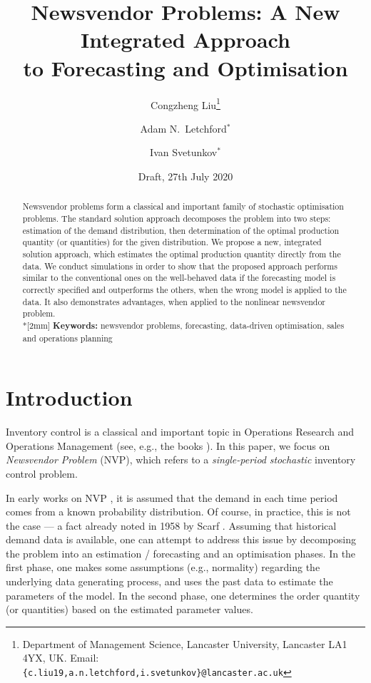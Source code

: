 \documentclass{article}
\title{Newsvendor Problems: A New Integrated Approach\\ to Forecasting and Optimisation}
\author{Congzheng Liu\thanks{Department of Management Science,
Lancaster University, Lancaster LA1 4YX, UK.
Email: {\tt \{c.liu19,a.n.letchford,i.svetunkov\}@lancaster.ac.uk}}
\and Adam N.\ Letchford$^*$ \and Ivan Svetunkov$^*$} %
\date{Draft, 27th July 2020}
\begin{document}
\maketitle

\begin{abstract}
Newsvendor problems form a classical and important family of stochastic optimisation problems. The standard solution approach decomposes the problem into two steps: estimation of the demand distribution, then determination of the optimal production quantity (or quantities) for the given distribution. We propose a new, integrated solution approach, which estimates the optimal production quantity directly from the data. We conduct simulations in order to show that the proposed approach performs similar to the conventional ones on the well-behaved data if the forecasting model is correctly specified and outperforms the others, when the wrong model is applied to the data. It also demonstrates advantages, when applied to the nonlinear newsvendor problem.%
\\*[2mm]
{\bf Keywords:} newsvendor problems, forecasting, data-driven optimisation, sales and operations planning
\end{abstract}


\section{Introduction}

Inventory control is a classical and important topic in Operations Research and Operations Management (see, e.g., the books \cite{Po02,SPP98,Zi00}). In this paper, we focus on \emph{Newsvendor Problem} (NVP), which refers to a \emph{single-period} \emph{stochastic} inventory control problem.

In early works on NVP \cite{AHM51,MK51}, it is assumed that the demand in each time period comes from a known probability distribution. Of course, in practice, this is not the case --- a fact already noted in 1958 by Scarf \cite{Sc58}. Assuming that historical demand data is available, one can attempt to address this issue by decomposing the problem into an estimation / forecasting and an optimisation phases.
In the first phase, one makes some assumptions (e.g., normality) regarding the underlying data generating process, and uses the past data to estimate the parameters of the model.
In the second phase, one determines the order quantity (or quantities) based on the estimated parameter values.
\end{document}
